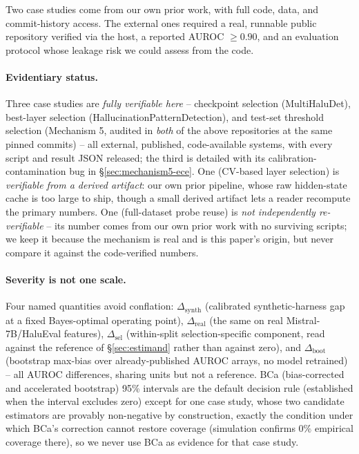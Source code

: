 \documentclass{article}
\begin{document}
Two case studies come from our own prior work, with full code, data, and
commit-history access. The external ones required a real, runnable public
repository verified via the host, a reported AUROC $\geq 0.90$, and an
evaluation protocol whose leakage risk we could assess from the code.

\paragraph{Evidentiary status.} Three case studies are \emph{fully verifiable
here} -- checkpoint selection (MultiHaluDet), best-layer selection
(HallucinationPatternDetection), and test-set threshold selection
(Mechanism 5, audited in \emph{both} of the above repositories at the same
pinned commits) -- all external, published, code-available systems,
with every script and result JSON released; the third is detailed with its
calibration-contamination bug in \S\ref{sec:mechanism5-ece}. One (CV-based
layer selection) is \emph{verifiable from a derived artifact}: our own prior
pipeline, whose raw hidden-state cache is too large to ship, though a small
derived artifact lets a reader recompute the primary numbers. One
(full-dataset probe reuse) is \emph{not independently re-verifiable} -- its
number comes from our own prior work with no surviving scripts; we keep it
because the mechanism is real and is this paper's origin, but never compare it
against the code-verified numbers.

\paragraph{Severity is not one scale.} Four named quantities avoid
conflation: $\Delta_{\text{synth}}$ (calibrated synthetic-harness gap at a
fixed Bayes-optimal operating point), $\Delta_{\text{real}}$ (the same on
real Mistral-7B/HaluEval features), $\Delta_{\text{sel}}$ (within-split
selection-specific component, read against the reference of
\S\ref{sec:estimand} rather than against zero), and
$\Delta_{\text{boot}}$ (bootstrap max-bias over already-published AUROC
arrays, no model retrained) -- all AUROC differences, sharing units but not
a reference. BCa (bias-corrected and accelerated bootstrap) 95\% intervals
are the default decision rule (established
when the interval excludes zero) except for one case study, whose two
candidate estimators are provably non-negative by construction, exactly the
condition under which BCa's correction cannot restore coverage (simulation
confirms $0\%$ empirical coverage there), so we never use BCa as evidence
for that case study.
\end{document}
